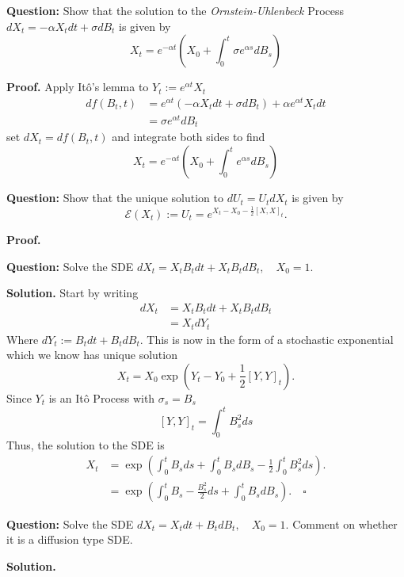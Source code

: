 \documentclass{article}
\begin{document}
\begin{tcolorbox}[colframe=black,colback=gray!5,boxrule=0.5pt]
\textbf{Question:} Show that the solution to the \textit{Ornstein-Uhlenbeck} Process $dX_t = -\alpha X_tdt + \sigma dB_t$ is given by 
$$X_t = e^{-\alpha t}\left(X_0 + \int_0^t\sigma e^{\alpha s}dB_s\right)$$
\end{tcolorbox}
\textbf{Proof.} Apply Itô's lemma to $Y_t := e^{\alpha t} X_t$ 
\begin{align*}
    df(B_t, t) &= e^{\alpha t}(-\alpha X_tdt + \sigma dB_t) + \alpha e^{\alpha t}X_t dt \\
               &= \sigma e^{\alpha t} dB_t
\end{align*}
set $dX_t = df(B_t,t)$ and integrate both sides to find 
$$X_t = e^{-\alpha t}\left(X_0 + \int_0^t e^{\alpha s}dB_s\right)$$

\begin{tcolorbox}[colframe=black,colback=gray!5,boxrule=0.5pt]
\textbf{Question:} Show that the unique solution to $dU_t = U_tdX_t$ is given by 
$$\mathcal{E}(X_t) := U_t = e^{X_t - X_0 - \frac{1}{2}[X,X]_t}.$$
\end{tcolorbox}
\textbf{Proof.}

\begin{tcolorbox}[colframe=black,colback=gray!5,boxrule=0.5pt]
\textbf{Question:} Solve the SDE $dX_t = X_tB_tdt + X_tB_tdB_t, \quad X_0=1$.
\end{tcolorbox}
\textbf{Solution.} Start by writing
\begin{align*}
    dX_t &= X_tB_tdt + X_tB_tdB_t \\
    &= X_tdY_t
\end{align*}
Where $dY_t := B_tdt + B_tdB_t$. This is now in the form of a stochastic exponential which we know has unique solution
$$X_t = X_0\exp\left(Y_t - Y_0 + \frac{1}{2}[Y,Y]_t\right).$$
Since $Y_t$ is an Itô Process with $\sigma_s = B_s$
$$[Y,Y]_t = \int_0^t B_s^2 ds$$
Thus, the solution to the SDE is 
\begin{align*}
    X_t &= \exp\left( \int_0^tB_sds + \int_0^t B_sdB_s - \frac{1}{2}\int_0^t B_s^2ds\right). \\
    &= \exp\left( \int_0^tB_s - \frac{B_s^2}{2}ds + \int_0^t B_sdB_s \right). \quad \square
\end{align*}

\begin{tcolorbox}[colframe=black,colback=gray!5,boxrule=0.5pt]
\textbf{Question:} Solve the SDE $dX_t = X_t dt + B_tdB_t, \quad X_0=1$. Comment on whether it is a diffusion type SDE. 
\end{tcolorbox}
\textbf{Solution.} 
\end{document}
